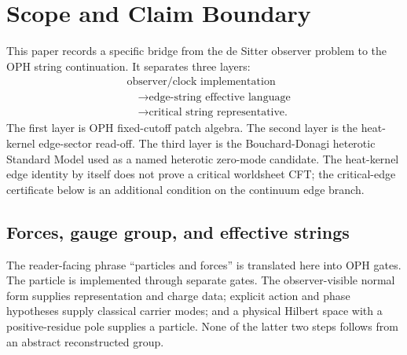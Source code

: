 \documentclass[11pt]{article}
\theoremstyle{remark}
\theoremstyle{plain}
\begin{document}
\tableofcontents
\newpage

\section{Scope and Claim Boundary}

This paper records a specific bridge from the de Sitter observer problem to the OPH string
continuation. It separates three layers:
\[
\begin{aligned}
&\text{observer/clock implementation}\\
&\quad\longrightarrow \text{edge-string effective language}\\
&\quad\longrightarrow \text{critical string representative.}
\end{aligned}
\]
The first layer is OPH fixed-cutoff patch algebra. The second layer is the heat-kernel
edge-sector read-off. The third layer is the Bouchard-Donagi heterotic Standard Model used as a
named heterotic zero-mode candidate. The heat-kernel edge identity by itself does not prove a critical
worldsheet CFT; the critical-edge certificate below is an additional condition on the continuum
edge branch.

\subsection{Forces, gauge group, and effective strings}

The reader-facing phrase ``particles and forces'' is translated here into OPH gates. The particle
is implemented through separate gates. The observer-visible normal form supplies representation
and charge data; explicit action and phase hypotheses supply classical carrier modes; and a
physical Hilbert space with a positive-residue pole supplies a particle. None of the latter two
steps follows from an abstract reconstructed group.
\end{document}
